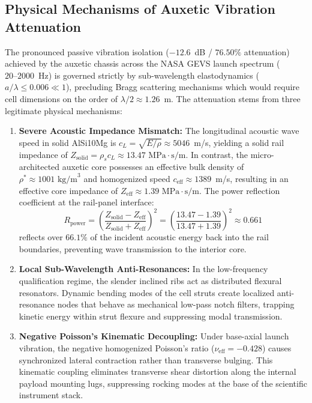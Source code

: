 \documentclass[preprint,12pt,3p]{elsarticle}
\begin{document}
\subsection{Physical Mechanisms of Auxetic Vibration Attenuation}
The pronounced passive vibration isolation ($-12.6$~dB / $76.50\%$ attenuation) achieved by the auxetic chassis across the NASA GEVS launch spectrum ($20\text{--}2000$~Hz) is governed strictly by sub-wavelength elastodynamics ($a / \lambda \le 0.006 \ll 1$), precluding Bragg scattering mechanisms which would require cell dimensions on the order of $\lambda/2 \approx 1.26$~m. The attenuation stems from three legitimate physical mechanisms:
\begin{enumerate}
  \item \textbf{Severe Acoustic Impedance Mismatch:} The longitudinal acoustic wave speed in solid AlSi10Mg is $c_L = \sqrt{E/\rho} \approx 5046$~m/s, yielding a solid rail impedance of $Z_{\text{solid}} = \rho_s c_L \approx 13.47\text{ MPa}\cdot\text{s/m}$. In contrast, the micro-architected auxetic core possesses an effective bulk density of $\rho^* \approx 1001\text{ kg/m}^3$ and homogenized speed $c_{\text{eff}} \approx 1389$~m/s, resulting in an effective core impedance of $Z_{\text{eff}} \approx 1.39\text{ MPa}\cdot\text{s/m}$. The power reflection coefficient at the rail-panel interface:
  \begin{equation}
    R_{\text{power}} = \left( \frac{Z_{\text{solid}} - Z_{\text{eff}}}{Z_{\text{solid}} + Z_{\text{eff}}} \right)^2 = \left( \frac{13.47 - 1.39}{13.47 + 1.39} \right)^2 \approx 0.661
  \end{equation}
  reflects over $66.1\%$ of the incident acoustic energy back into the rail boundaries, preventing wave transmission to the interior core.
  \item \textbf{Local Sub-Wavelength Anti-Resonances:} In the low-frequency qualification regime, the slender inclined ribs act as distributed flexural resonators. Dynamic bending modes of the cell struts create localized anti-resonance nodes that behave as mechanical low-pass notch filters, trapping kinetic energy within strut flexure and suppressing modal transmission.
  \item \textbf{Negative Poisson's Kinematic Decoupling:} Under base-axial launch vibration, the negative homogenized Poisson's ratio ($\nu_{\text{eff}} = -0.428$) causes synchronized lateral contraction rather than transverse bulging. This kinematic coupling eliminates transverse shear distortion along the internal payload mounting lugs, suppressing rocking modes at the base of the scientific instrument stack.
\end{enumerate}
\end{document}
